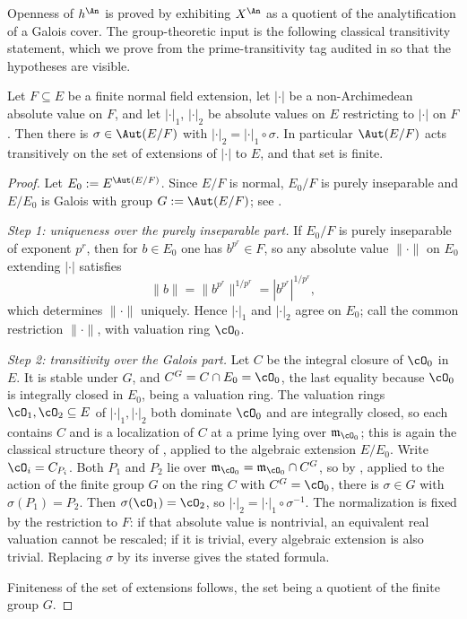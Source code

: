 Openness of $h^{\An}$ is proved by exhibiting $X^{\An}$ as a quotient of
the analytification of a Galois cover.  The group-theoretic input is the
following classical transitivity statement, which we prove from the
prime-transitivity tag audited in  so that the
hypotheses are visible.

\begin{lemma}
\label{lem:ch41-value-transitivity}
Let $F\subseteq E$ be a finite normal field extension, let $|\cdot|$ be
a non-Archimedean absolute value on $F$, and let $|\cdot|_1$,
$|\cdot|_2$ be absolute values on $E$ restricting to $|\cdot|$ on
$F$.  Then there is $\sigma\in\Aut(E/F)$ with
$|\cdot|_2=|\cdot|_1\circ\sigma$.  In particular $\Aut(E/F)$ acts
transitively on the set of extensions of $|\cdot|$ to $E$, and that set
is finite.
\end{lemma}

\begin{proof}
Let $E_0:=E^{\Aut(E/F)}$.  Since $E/F$ is normal, $E_0/F$ is purely
inseparable and $E/E_0$ is Galois with group $G:=\Aut(E/F)$; see
\cite[Chapter~II]{ZariskiSamuelII}.

\emph{Step 1: uniqueness over the purely inseparable part.}  If
$E_0/F$ is purely inseparable of exponent $p^r$, then for $b\in E_0$
one has $b^{p^r}\in F$, so any absolute value $\|\cdot\|$ on $E_0$
extending $|\cdot|$ satisfies
\[
 \|b\|=\|b^{p^r}\|^{1/p^r}=|b^{p^r}|^{1/p^r},
\tag{41.4}\label{eq:ch41-inseparable-formula}
\]
which determines $\|\cdot\|$ uniquely.  Hence $|\cdot|_1$ and
$|\cdot|_2$ agree on $E_0$; call the common restriction $\|\cdot\|$,
with valuation ring $\cO_0$.

\emph{Step 2: transitivity over the Galois part.}  Let $C$ be the integral
closure of $\cO_0$ in $E$.  It is stable under $G$, and
$C^G=C\cap E_0=\cO_0$, the last equality because $\cO_0$ is integrally
closed in $E_0$, being a valuation ring.  The valuation rings
$\cO_1,\cO_2\subseteq E$ of $|\cdot|_1,|\cdot|_2$ both dominate
$\cO_0$ and are integrally closed, so each contains $C$ and is a
localization of $C$ at a prime lying over $\mathfrak m_{\cO_0}$; this is
again the classical structure theory of \cite[Chapter~VI,
\S11]{ZariskiSamuelII}, applied to the algebraic extension $E/E_0$.  Write
$\cO_i=C_{P_i}$.  Both $P_1$ and $P_2$ lie over
$\mathfrak m_{\cO_0}=\mathfrak m_{\cO_0}\cap C^G$, so by
\cite[\href{https://stacks.math.columbia.edu/tag/0BRI}{Tag 0BRI}]
{stacks-project}, applied to the action of the finite group $G$ on the
ring $C$ with $C^G=\cO_0$, there is $\sigma\in G$ with
$\sigma(P_1)=P_2$.  Then $\sigma(\cO_1)=\cO_2$, so
$|\cdot|_2=|\cdot|_1\circ\sigma^{-1}$.
The normalization is fixed by the restriction to $F$: if that absolute
value is nontrivial, an equivalent real valuation cannot be rescaled;
if it is trivial, every algebraic extension is also trivial.
Replacing $\sigma$ by its inverse gives the stated formula.

Finiteness of the set of extensions follows, the set being a quotient of the
finite group $G$.
\end{proof}

